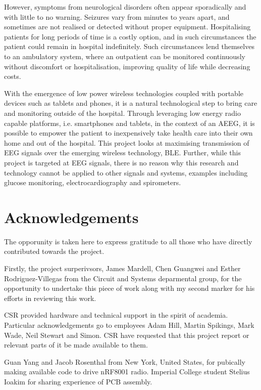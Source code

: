 \documentclass[]{article}
\begin{document}
However, symptoms from neurological disorders often appear sporadically and with little to no warning. Seizures vary from minutes to years apart, and sometimes are not realised or detected without proper equipment. Hospitalising patients for long periods of time is a costly option, and in such circumstances the patient could remain in hospital indefinitely.  Such circumstances lend themselves to an ambulatory system, where an outpatient can be monitored continuously without discomfort or hospitalisation, improving quality of life while decreasing costs. 

With the emergence of low power wireless technologies coupled with portable devices such as tablets and phones, it is a natural technological step to bring care and monitoring outside of the hospital. Through leveraging low energy radio capable platforms, i.e. smartphones and tablets, in the context of an \ac{AEEG}, it is possible to empower the patient to inexpensively take health care into their own home and out of the hospital. This project looks at maximising transmission of \ac{EEG} signals over the emerging wireless technology, \ac{BLE}. Further, while this project is targeted at \ac{EEG} signals, there is no reason why this research and technology cannot be applied to other signals and systems, examples including glucose monitoring, electrocardiography and spirometers.


\clearpage
\tableofcontents
\clearpage

\section{Acknowledgements}
The opporunity is taken here to express gratitude to all those who have directly contributed towards the project. 

Firstly, the project surperivsors, James Mardell, Chen Guangwei and Esther Rodriguez-Villegas from the Circuit and Systems deparmental group, for the opportunity to undertake this piece of work along with my second marker for his efforts in reviewing this work. 

\ac{CSR} provided hardware and technical support in the spirit of academia. Particular acknowledgements go to employees Adam Hill, Martin Spikings, Mark Wade, Neil Stewart and Simon. CSR have requested that this project report or relevant parts of it be made available to them.

Guan Yang and Jacob Rosenthal from New York, United States, for pubically making available code to drive nRF8001 radio. Imperial College student Stelius Ioakim for sharing experience of \ac{PCB} assembly. 
\end{document}
